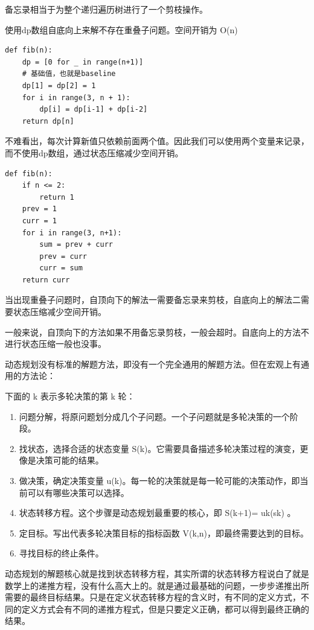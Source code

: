 备忘录相当于为整个递归遍历树进行了一个剪枝操作。

使用dp数组自底向上来解不存在重叠子问题。空间开销为 O(n)
\begin{lstlisting}
def fib(n):
    dp = [0 for _ in range(n+1)]
    # 基础值，也就是baseline
    dp[1] = dp[2] = 1
    for i in range(3, n + 1):
        dp[i] = dp[i-1] + dp[i-2]
    return dp[n]
\end{lstlisting}

不难看出，每次计算新值只依赖前面两个值。因此我们可以使用两个变量来记录，而不使用dp数组，通过状态压缩减少空间开销。
\begin{lstlisting}
def fib(n):
    if n <= 2:
        return 1
    prev = 1
    curr = 1
    for i in range(3, n+1):
        sum = prev + curr
        prev = curr
        curr = sum
    return curr
\end{lstlisting}

当出现重叠子问题时，自顶向下的解法一需要备忘录来剪枝，自底向上的解法二需要状态压缩减少空间开销。

一般来说，自顶向下的方法如果不用备忘录剪枝，一般会超时。自底向上的方法不进行状态压缩一般也没事。

{\bfseries {}}

动态规划没有标准的解题方法，即没有一个完全通用的解题方法。但在宏观上有通用的方法论：

下面的 k 表示多轮决策的第 k 轮：
\begin{enumerate}
    \item 问题分解，将原问题划分成几个子问题。一个子问题就是多轮决策的一个阶段。
    \item 找状态，选择合适的状态变量 S(k)。它需要具备描述多轮决策过程的演变，更像是决策可能的结果。
    \item 做决策，确定决策变量 u(k)。每一轮的决策就是每一轮可能的决策动作，即当前可以有哪些决策可以选择。
    \item 状态转移方程。这个步骤是动态规划最重要的核心，即 S(k+1)= uk(sk) 。
    \item 定目标。写出代表多轮决策目标的指标函数 V(k,n)，即最终需要达到的目标。
    \item 寻找目标的终止条件。
\end{enumerate}

{\bfseries {}}

动态规划的解题核心就是找到状态转移方程，其实所谓的状态转移方程说白了就是数学上的递推方程，没有什么高大上的。就是通过最基础的问题，一步步递推出所需要的最终目标结果。只是在定义状态转移方程的含义时，有不同的定义方式，不同的定义方式会有不同的递推方程式，但是只要定义正确，都可以得到最终正确的结果。

